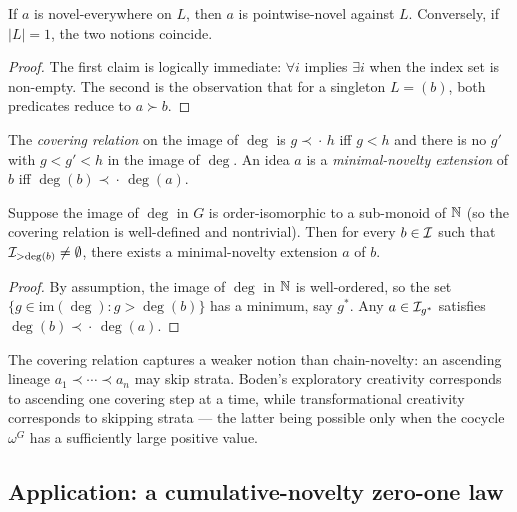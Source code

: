 \begin{lemma}\label{lem:quant-mono}
If $a$ is novel-everywhere on $L$, then $a$ is pointwise-novel
against $L$. Conversely, if $|L|=1$, the two notions coincide.
\end{lemma}

\begin{proof}
The first claim is logically immediate: $\forall i$ implies
$\exists i$ when the index set is non-empty. The second is the
observation that for a singleton $L = (b)$, both predicates reduce to
$a\succ b$.
\end{proof}

\begin{definition}\label{def:cover}
The \emph{covering relation} on the image of $\deg$ is
$g \prec\!\!\cdot\, h$ iff $g < h$ and there is no $g'$ with $g < g' <
h$ in the image of $\deg$. An idea $a$ is a \emph{minimal-novelty
extension} of $b$ iff $\deg(b) \prec\!\!\cdot\, \deg(a)$.
\end{definition}

\begin{proposition}
\label{prop:min-extension}
Suppose the image of $\deg$ in $G$ is order-isomorphic to a sub-monoid
of $\mathbb{N}$ (so the covering relation is well-defined and
nontrivial). Then for every $b\in\mathcal{I}$ such that $\mathcal{I}_{>\deg(b)}
\neq\emptyset$, there exists a minimal-novelty extension $a$ of $b$.
\end{proposition}

\begin{proof}
By assumption, the image of $\deg$ in $\mathbb{N}$ is well-ordered, so the
set $\{g\in\mathrm{im}(\deg) : g > \deg(b)\}$ has a minimum, say $g^*$.
Any $a\in\mathcal{I}_{g^*}$ satisfies $\deg(b)\prec\!\!\cdot\,\deg(a)$.
\end{proof}

\begin{remark}
The covering relation captures a weaker notion than chain-novelty: an
ascending lineage $a_1\prec\cdots\prec a_n$ may skip strata. Boden's
exploratory creativity \cite{Boden2004} corresponds to ascending one
covering step at a time, while transformational creativity corresponds
to skipping strata --- the latter being possible only when the cocycle
$\omega^G$ has a sufficiently large positive value.
\end{remark}

\subsection*{Application: a cumulative-novelty zero-one law}

